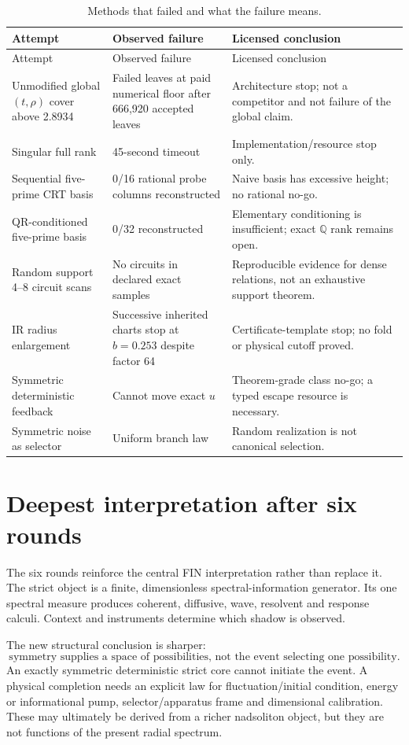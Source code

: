 \documentclass[11pt,a4paper]{article}
\theoremstyle{definition}\newtheorem{definition}[theorem]{Definition}
\theoremstyle{remark}\newtheorem{remark}[theorem]{Remark}
\begin{document}
\begin{longtable}{@{}p{}p{}p{}@{}}\caption{Methods that failed and what the failure means.}\\\toprule Attempt&Observed failure&Licensed conclusion\\\midrule\endfirsthead\toprule Attempt&Observed failure&Licensed conclusion\\\midrule\endhead
Unmodified global $(t,\rho)$ cover above 2.8934&Failed leaves at paid numerical floor after 666,920 accepted leaves&Architecture stop; not a competitor and not failure of the global claim.\\
Singular full rank&45-second timeout&Implementation/resource stop only.\\
Sequential five-prime CRT basis&0/16 rational probe columns reconstructed&Naive basis has excessive height; no rational no-go.\\
QR-conditioned five-prime basis&0/32 reconstructed&Elementary conditioning is insufficient; exact $\mathbb Q$ rank remains open.\\
Random support 4--8 circuit scans&No circuits in declared exact samples&Reproducible evidence for dense relations, not an exhaustive support theorem.\\
IR radius enlargement&Successive inherited charts stop at $b=0.253$ despite factor 64&Certificate-template stop; no fold or physical cutoff proved.\\
Symmetric deterministic feedback&Cannot move exact $u$&Theorem-grade class no-go; a typed escape resource is necessary.\\
Symmetric noise as selector&Uniform branch law&Random realization is not canonical selection.\\\bottomrule\end{longtable}

\section{Deepest interpretation after six rounds}

The six rounds reinforce the central FIN interpretation rather than replace it. The strict object is a finite, dimensionless spectral-information generator. Its one spectral measure produces coherent, diffusive, wave, resolvent and response calculi. Context and instruments determine which shadow is observed.

The new structural conclusion is sharper:
\[
\boxed{\text{symmetry supplies a space of possibilities, not the event selecting one possibility}.}
\]
An exactly symmetric deterministic strict core cannot initiate the event. A physical completion needs an explicit law for fluctuation/initial condition, energy or informational pump, selector/apparatus frame and dimensional calibration. These may ultimately be derived from a richer nadsoliton object, but they are not functions of the present radial spectrum.
\end{document}
